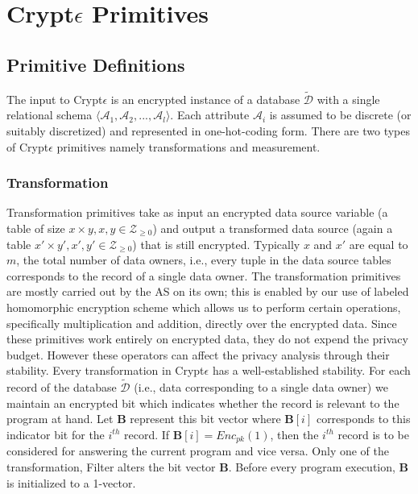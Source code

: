 \section{Crypt$\epsilon$ Primitives}
\subsection{Primitive Definitions} 
The input to Crypt$\epsilon$ is an encrypted instance of a database $\boldsymbol{\tilde{\mathcal{D}}}$ with a single relational schema $\langle \mathcal{A}_1,\mathcal{A}_2, . . . ,\mathcal{A}_l\rangle$. Each attribute $\mathcal{A}_i$ is assumed to be discrete
(or suitably discretized) and represented in one-hot-coding form. 
There are two types of Crypt$\epsilon$ primitives namely transformations and measurement.
\subsubsection{\textbf{Transformation}}
 Transformation primitives take
as input an encrypted data source variable (a table of size $x \times y, x,y \in \mathcal{Z}_{\geq 0}$) and output
a transformed data source (again  a table $x' \times y', x',y' \in \mathcal{Z}_{\geq 0}$) that is still encrypted. Typically $x$ and $x'$ are equal to $m$, the total number of data owners, i.e., every tuple in the data source tables corresponds to the record of a single data owner.
The transformation primitives are mostly carried out by the \textsf{AS} on its own; this is enabled by our use of labeled homomorphic encryption scheme which allows us to perform certain operations, specifically multiplication and addition, directly over the encrypted data. %
Since these primitives work entirely on encrypted data, they do not expend the privacy budget. However these operators can affect the privacy analysis through their stability. Every transformation in Crypt$\epsilon$ has a well-established stability.
For each record of the database $\boldsymbol{\tilde{\mathcal{D}}}$ (i.e., data corresponding to a single data owner) we maintain an encrypted bit which indicates whether the record is relevant to the program at hand. Let $\mathbf{B}$ represent this bit vector where $\mathbf{B}[i]$ corresponds to this indicator bit for the $i^{th}$ record.  If $\mathbf{B}[i] =Enc_{pk}(1)$, then the $i^{th}$ record is to be considered for answering the current program and vice versa. Only one of the transformation, \textsf{Filter} alters the bit vector $\mathbf{B}$. Before every program execution, $\mathbf{B}$ is initialized to a 1-vector. 
